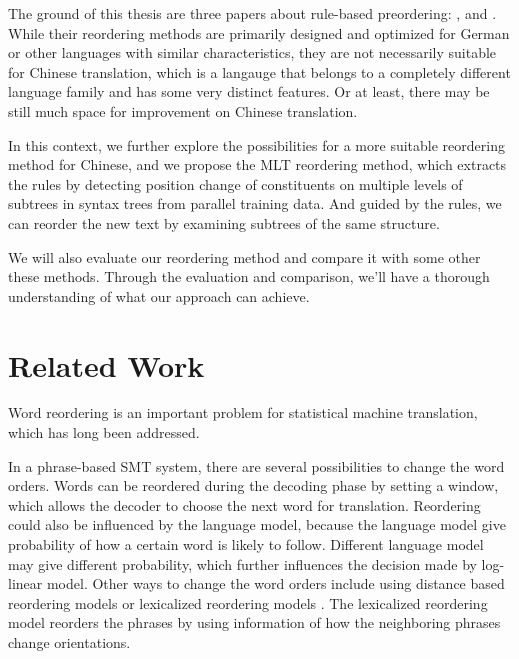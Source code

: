 The ground of this thesis are three papers about rule-based preordering: \cite{short}, \cite{long} and \cite{tree}. While their reordering methods are primarily designed and optimized for German or other languages with similar characteristics, they are not necessarily suitable for Chinese translation, which is a langauge that belongs to a completely different language family and has some very distinct features. Or at least, there may be still much space for improvement on Chinese translation.

In this context, we further explore the possibilities for a more suitable reordering method for Chinese, and we propose the \ac{MLT} reordering method, which extracts the rules by detecting position change of constituents on multiple levels of subtrees in syntax trees from parallel training data. And guided by the rules, we can reorder the new text by examining subtrees of the same structure.

We will also evaluate our reordering method and compare it with some other these methods. Through the evaluation and comparison, we'll have a thorough understanding of what our approach can achieve.





\section{Related Work}
\label{ch:Introduction:sec:RelatedWork}

Word reordering is an important problem for statistical machine translation, which has long been addressed.

In a phrase-based \ac{SMT} system, there are several possibilities to change the word orders. Words can be reordered during the decoding phase by setting a window, which allows the decoder to choose the next word for translation. Reordering could also be influenced by the language model, because the language model give probability of how a certain word is likely to follow. Different language model may give different probability, which further influences the decision made by log-linear model. Other ways to change the word orders include using distance based reordering models or lexicalized reordering models \citep{tillmann2004, koehn2005}. The lexicalized reordering model reorders the phrases by using information of how the neighboring phrases change orientations.

